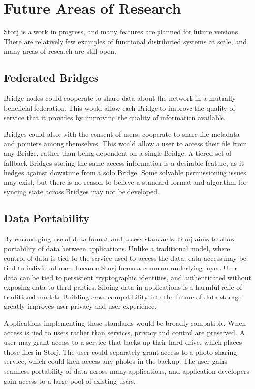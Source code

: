 \documentclass[a4paper,10pt]{article}
\begin{document}
\section{Future Areas of Research}
Storj is a work in progress, and many features are planned for future versions.
There are relatively few examples of functional distributed systems at scale,
and many areas of research are still open.

\subsection{Federated Bridges}
Bridge nodes could cooperate to share data about the network in a mutually
beneficial federation. This would allow each Bridge to improve the quality of
service that it provides by improving the quality of information available.

Bridges could also, with the consent of users, cooperate to share file metadata
and pointers among themselves. This would allow a user to access their file from
any Bridge, rather than being dependent on a single Bridge. A tiered set of
fallback Bridges storing the same access information is a desirable feature, as
it hedges against downtime from a solo Bridge. Some solvable permissioning
issues may exist, but there is no reason to believe a standard format and
algorithm for syncing state across Bridges may not be developed.

\subsection{Data Portability}
By encouraging use of data format and access standards, Storj aims to allow
portability of data between applications. Unlike a traditional model, where
control of data is tied to the service used to access the data, data access may
be tied to individual users because Storj forms a common underlying layer. User
data can be tied to persistent cryptographic identities, and authenticated
without exposing data to third parties. Siloing data in applications is a
harmful relic of traditional models. Building cross-compatibility into the
future of data storage greatly improves user privacy and user experience.

Applications implementing these standards would be broadly compatible. When
access is tied to users rather than services, privacy and control are preserved.
A user may grant access to a service that backs up their hard drive, which
places those files in Storj. The user could separately grant access to a
photo-sharing service, which could then access any photos in the backup. The
user gains seamless portability of data across many applications, and
application developers gain access to a large pool of existing users.
\end{document}
